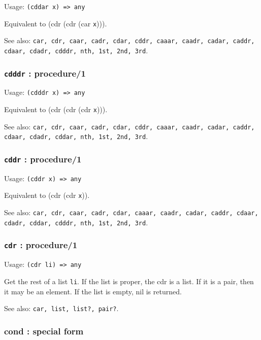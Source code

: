 \documentclass[
]{article}
\newcommand{\passthrough}[1]{#1}
\begin{document}
Usage: \passthrough{\lstinline!(cddar x) => any!}

Equivalent to (cdr (cdr (car \passthrough{\lstinline!x!}))).

See also:
\passthrough{\lstinline!car, cdr, caar, cadr, cdar, cddr, caaar, caadr, cadar, caddr, cdaar, cdadr, cdddr, nth, 1st, 2nd, 3rd!}.

\hypertarget{cdddr-procedure1}{%
\subsubsection{\texorpdfstring{\texttt{cdddr} :
procedure/1}{cdddr : procedure/1}}\label{cdddr-procedure1}}

Usage: \passthrough{\lstinline!(cdddr x) => any!}

Equivalent to (cdr (cdr (cdr \passthrough{\lstinline!x!}))).

See also:
\passthrough{\lstinline!car, cdr, caar, cadr, cdar, cddr, caaar, caadr, cadar, caddr, cdaar, cdadr, cddar, nth, 1st, 2nd, 3rd!}.

\hypertarget{cddr-procedure1}{%
\subsubsection{\texorpdfstring{\texttt{cddr} :
procedure/1}{cddr : procedure/1}}\label{cddr-procedure1}}

Usage: \passthrough{\lstinline!(cddr x) => any!}

Equivalent to (cdr (cdr \passthrough{\lstinline!x!})).

See also:
\passthrough{\lstinline!car, cdr, caar, cadr, cdar, caaar, caadr, cadar, caddr, cdaar, cdadr, cddar, cdddr, nth, 1st, 2nd, 3rd!}.

\hypertarget{cdr-procedure1}{%
\subsubsection{\texorpdfstring{\texttt{cdr} :
procedure/1}{cdr : procedure/1}}\label{cdr-procedure1}}

Usage: \passthrough{\lstinline!(cdr li) => any!}

Get the rest of a list \passthrough{\lstinline!li!}. If the list is
proper, the cdr is a list. If it is a pair, then it may be an element.
If the list is empty, nil is returned.

See also: \passthrough{\lstinline!car, list, list?, pair?!}.

\hypertarget{cond-special-form}{%
\subsubsection{cond : special form}\label{cond-special-form}}
\end{document}
